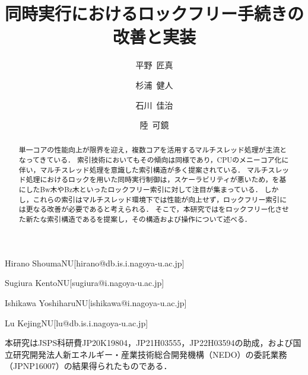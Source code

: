 \documentclass[
  submit,
  techrep,
  noauthor,
  a4paper,
  notitlepage,
  ja=standard,
  autodetect-engine,
  dvi=dvipdfmx
]{ipsj}
\begin{document}
\title{同時実行\Bptree{}におけるロックフリー手続きの改善と実装}


\author{平野~匠真}{Hirano Shouma}{NU}[hirano@db.is.i.nagoya-u.ac.jp]
\author{杉浦~健人}{Sugiura Kento}{NU}[sugiura@i.nagoya-u.ac.jp]
\author{石川~佳治}{Ishikawa Yoshiharu}{NU}[ishikawa@i.nagoya-u.ac.jp]
\author{陸~可鏡}{Lu Kejing}{NU}[lu@db.is.i.nagoya-u.ac.jp]

\begin{abstract}
  単一コアの性能向上が限界を迎え，複数コアを活用するマルチスレッド処理が主流となってきている．
  索引技術においてもその傾向は同様であり，CPUのメニーコア化に伴い，マルチスレッド処理を意識した索引構造が多く提案されている．
  マルチスレッド処理におけるロックを用いた同時実行制御は，スケーラビリティが悪いため，\Bptree{}を基にしたBw木やBz木といったロックフリー索引に対して注目が集まっている．
  しかし，これらの索引はマルチスレッド環境下では性能が向上せず，ロックフリー索引には更なる改善が必要であると考えられる．
  そこで，本研究では\Bptree{}をロックフリー化させた新たな索引構造である\Bctree{}を提案し，その構造および操作について述べる．
\end{abstract}

\maketitle



\begin{acknowledgment}
  本研究はJSPS科研費JP20K19804，JP21H03555，JP22H03594の助成，および国立研究開発法人新エネルギー・産業技術総合開発機構（NEDO）の委託業務（JPNP16007）の結果得られたものである．
\end{acknowledgment}



\end{document}
